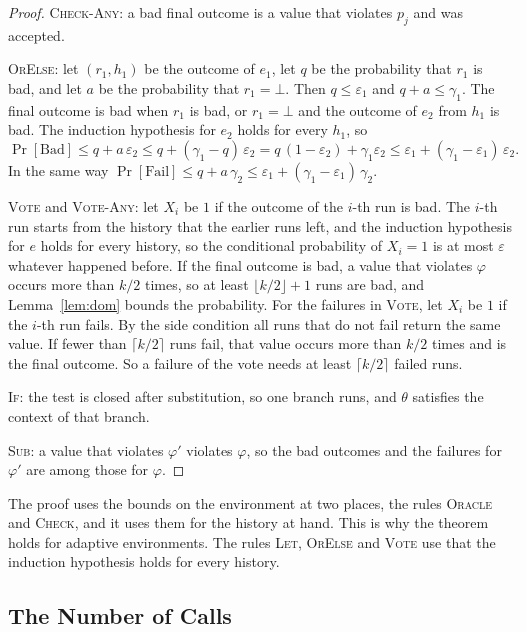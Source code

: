 \documentclass[acmsmall,nonacm,screen]{acmart}
\newcommand{\Bad}{\mathrm{Bad}}
\newcommand{\Fail}{\mathrm{Fail}}
\begin{document}
\begin{proof}
\textsc{Check-Any}: a bad final outcome is a value that violates $p_j$ and was accepted.

\textsc{OrElse}: let $(r_1, h_1)$ be the outcome of $e_1$, let $q$ be the probability that
$r_1$ is bad, and let $a$ be the probability that $r_1 = \bot$. Then $q \le \varepsilon_1$
and $q + a \le \gamma_1$. The final outcome is bad when $r_1$ is bad, or $r_1 = \bot$ and the
outcome of $e_2$ from $h_1$ is bad. The induction hypothesis for $e_2$ holds for every $h_1$,
so
\[
\Pr[\Bad] \le q + a\,\varepsilon_2 \le q + (\gamma_1 - q)\,\varepsilon_2
  = q\,(1 - \varepsilon_2) + \gamma_1 \varepsilon_2
  \le \varepsilon_1 + (\gamma_1 - \varepsilon_1)\,\varepsilon_2 .
\]
In the same way $\Pr[\Fail] \le q + a\,\gamma_2 \le \varepsilon_1 + (\gamma_1 -
\varepsilon_1)\,\gamma_2$.

\textsc{Vote} and \textsc{Vote-Any}: let $X_i$ be $1$ if the outcome of the $i$-th run is bad.
The $i$-th run starts from the history that the earlier runs left, and the induction
hypothesis for $e$ holds for every history, so the conditional probability of $X_i = 1$ is at
most $\varepsilon$ whatever happened before. If the final outcome is bad, a value that
violates $\varphi$ occurs more than $k/2$ times, so at least $\lfloor k/2 \rfloor + 1$ runs
are bad, and Lemma~\ref{lem:dom} bounds the probability. For the failures in \textsc{Vote},
let $X_i$ be $1$ if the $i$-th run fails. By the side condition all runs that do not fail
return the same value. If fewer than $\lceil k/2 \rceil$ runs fail, that value occurs more
than $k/2$ times and is the final outcome. So a failure of the vote needs at least
$\lceil k/2 \rceil$ failed runs.

\textsc{If}: the test is closed after substitution, so one branch runs, and $\theta$
satisfies the context of that branch.

\textsc{Sub}: a value that violates $\varphi'$ violates $\varphi$, so the bad outcomes and
the failures for $\varphi'$ are among those for $\varphi$.
\end{proof}

The proof uses the bounds on the environment at two places, the rules \textsc{Oracle} and
\textsc{Check}, and it uses them for the history at hand. This is why the theorem holds for
adaptive environments. The rules \textsc{Let}, \textsc{OrElse} and \textsc{Vote} use that the
induction hypothesis holds for every history.

\subsection{The Number of Calls}
\end{document}
